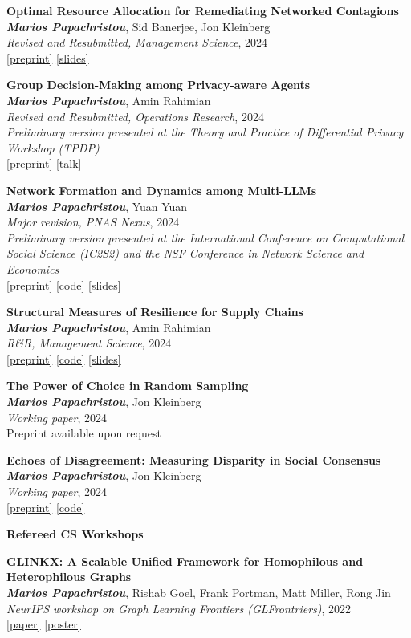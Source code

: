\documentclass[margin]{res}
\newcommand{\field}[2]{\noindent \textbf{#1} \hfill #2 \\}
\newcommand{\specialurl}[2]{\href {#2} {{{[#1]}}}}
\newcommand{\preprint}[1]{\specialurl {preprint} {#1}}
\newcommand{\code}[1]{\specialurl {code} {#1}}
\newcommand{\talk}[1]{\specialurl {talk} {#1}}
\newcommand{\slides}[1]{\specialurl {slides} {#1}}
\newcommand{\poster}[1]{\specialurl {poster} {#1}}
\newcommand{\paper}[1]{\specialurl {paper} {#1}}
\newcommand{\authorref}[1]{{\textit{\textbf{#1}}}}
\newcommand{\authorme}{\authorref{Marios Papachristou}}
\newcommand{\publication}[5]{\textbf{#1}\\{#2}\\\emph{#3}, {#4}\\{#5}\smallskip}
\begin{document}
\begin{resume}
{\begin{enumerate}[nosep, label={[WP\arabic*]}]
   \item \publication{Optimal Resource Allocation for Remediating Networked Contagions}{\authorme, Sid Banerjee, Jon Kleinberg}{Revised and Resubmitted, Management Science}{2024}{\preprint{https://papers.ssrn.com/sol3/papers.cfm?abstract_id=4880536} \slides{https://drive.google.com/file/d/1DgOCnJ5Pf3Je-F7a-Adiy2TTZ7oZUbbB/view?usp=sharing}} 
      \item \publication{Group Decision-Making among Privacy-aware Agents}{\authorme, Amin Rahimian}{Revised and Resubmitted, Operations Research}{2024}{
  		\emph{Preliminary version presented at the Theory and Practice of Differential Privacy Workshop (TPDP)} \\ \preprint{https://arxiv.org/pdf/2402.08156.pdf} \talk{https://www.youtube.com/watch?v=Kmm5HEMuS4w}}
  		
   \item \publication{Network Formation and Dynamics among Multi-LLMs}{\authorme, Yuan Yuan}{Major revision, PNAS Nexus}{2024}{\emph{Preliminary version presented at the International Conference on Computational Social Science (IC2S2) and the NSF Conference in Network Science and Economics} \\ \preprint{http://arxiv.org/abs/2402.10659} \code{https://github.com/papachristoumarios/llm-network-formation} \slides{https://drive.google.com/file/d/13Qm_82D0WrkmN1LAv2AUmjcputMOdm_y/view?usp=drive_link}} 
      
   	   
   \item \publication{Structural Measures of Resilience for Supply Chains}{\authorme, Amin Rahimian}{R\&R, Management Science}{2024}{ 
   		\preprint{https://papers.ssrn.com/sol3/papers.cfm?abstract_id=4392226} \code{https://github.com/papachristoumarios/supply-chain-resilience} \slides{https://drive.google.com/file/d/13kgKnjTHyO8j4BOJVykWwt43hSt3JrLw/view?usp=drive_link}}
   		
   	\item \publication{The Power of Choice in Random Sampling}{\authorme, Jon Kleinberg}{Working paper}{2024}{Preprint available upon request}
   
   	\item \publication{Echoes of Disagreement: Measuring Disparity in Social Consensus}{\authorme, Jon Kleinberg}{Working paper}{2024}{\preprint{https://arxiv.org/abs/2504.07480} \code{https://github.com/papachristoumarios/disparity-optimization}}
    \end{enumerate}}


\field{Refereed CS Workshops}{}{
\begin{enumerate}[nosep, label={[W\arabic*]}]  
	\item \publication{GLINKX: A Scalable Unified Framework for Homophilous and Heterophilous Graphs}{\authorme, Rishab Goel, Frank Portman, Matt Miller, Rong Jin}{NeurIPS workshop on Graph Learning Frontiers (GLFrontriers)}{2022}{\paper{https://openreview.net/forum?id=GlViaJSwnlK} \poster{https://drive.google.com/file/d/14LwkvoH7sUe6qGvINGqTuMSHid16J3Av/view?usp=share_link}}
\end{enumerate}}


\end{resume}
\end{document}
